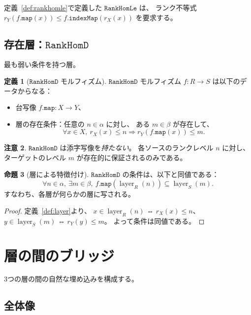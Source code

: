 \documentclass[11pt,a4paper,ja=standard]{bxjsarticle}
\theoremstyle{definition}
\newtheorem{definition}{定義}[section]
\newtheorem{proposition}[definition]{命題}
\newtheorem{remark}[definition]{注意}
\newcommand{\layer}{\operatorname{layer}}
\newcommand{\RankHomLe}{\mathtt{RankHomLe}}
\newcommand{\RankHomD}{\mathtt{RankHomD}}
\begin{document}
定義~\ref{def:rankhomle}で定義した $\RankHomLe$ は、
ランク不等式 $r_Y(f.\mathtt{map}(x)) \le f.\mathtt{indexMap}(r_X(x))$ を要求する。

\subsection{存在層：\texorpdfstring{$\RankHomD$}{RankHomD}}

最も弱い条件を持つ層。

\begin{definition}[$\RankHomD$ モルフィズム]\label{def:rankhomd}
$\RankHomD$ モルフィズム $f : R \to S$ は以下のデータからなる：
\begin{itemize}
\item 台写像 $f.\mathtt{map} : X \to Y$、
\item 層の存在条件：任意の $n \in \alpha$ に対し、
ある $m \in \beta$ が存在して、
\[
  \forall x \in X,\ r_X(x) \le n \Rightarrow r_Y(f.\mathtt{map}(x)) \le m.
\]
\end{itemize}
\end{definition}

\begin{remark}
$\RankHomD$ は添字写像を\emph{持たない}。
各ソースのランクレベル $n$ に対し、ターゲットのレベル $m$ が存在的に保証されるのみである。
\end{remark}

\begin{proposition}[層による特徴付け]
$\RankHomD$ の条件は、以下と同値である：
\[
  \forall n \in \alpha,\ \exists m \in \beta,\
  f.\mathtt{map}(\layer_R(n)) \subseteq \layer_S(m).
\]
すなわち、各層が何らかの層に写される。
\end{proposition}

\begin{proof}
定義~\ref{def:layer}より、
$x \in \layer_R(n)$ ⇔ $r_X(x) \le n$、
$y \in \layer_S(m)$ ⇔ $r_Y(y) \le m$。
よって条件は同値である。
\end{proof}

\section{層の間のブリッジ}

3つの層の間の自然な埋め込みを構成する。

\subsection{全体像}
\end{document}
